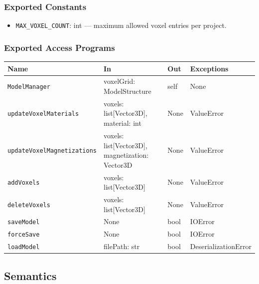 \documentclass[12pt, titlepage]{article}
\begin{document}
\subsubsection{Exported Constants}
\begin{itemize}
  \item \texttt{MAX\_VOXEL\_COUNT}: int — maximum allowed voxel entries per project.
\end{itemize}

\subsubsection{Exported Access Programs}
\begin{center}
\renewcommand{\arraystretch}{1.3}
\begin{tabular}{p{6cm} p{4.5cm} p{2cm} p{3.5cm}}
\toprule
\textbf{Name} & \textbf{In} & \textbf{Out} & \textbf{Exceptions} \\
\midrule
\texttt{ModelManager} & voxelGrid: ModelStructure & self & None \\
\texttt{updateVoxelMaterials} & voxels: list[Vector3D], \newline material: int & None & ValueError \\
\texttt{updateVoxelMagnetizations} & voxels: list[Vector3D], \newline magnetization: Vector3D & None & ValueError \\
\texttt{addVoxels} & voxels: list[Vector3D] & None & ValueError \\
\texttt{deleteVoxels} & voxels: list[Vector3D] & None & ValueError \\
\texttt{saveModel} & None & bool & IOError \\
\texttt{forceSave} & None & bool & IOError \\
\texttt{loadModel} & filePath: str & bool & DeserializationError \\
\bottomrule
\end{tabular}
\end{center}


\subsection{Semantics}
\end{document}
